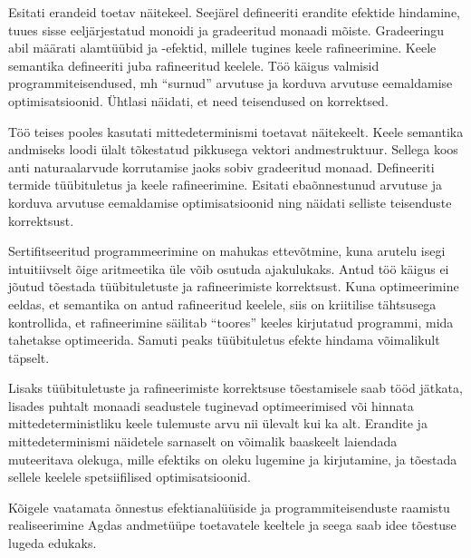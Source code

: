\documentclass[a4paper,12pt]{article}
\begin{document}
Esitati erandeid toetav näitekeel.
Seejärel defineeriti erandite efektide hindamine, tuues sisse eeljärjestatud monoidi ja gradeeritud monaadi mõiste.
Gradeeringu abil määrati alamtüübid ja -efektid, millele tugines keele rafineerimine.
Keele semantika defineeriti juba rafineeritud keelele.
Töö käigus valmisid programmiteisendused, mh ``surnud'' arvutuse ja korduva arvutuse eemaldamise optimisatsioonid.
Ühtlasi näidati, et need teisendused on korrektsed.

Töö teises pooles kasutati mittedeterminismi toetavat näitekeelt.
Keele semantika andmiseks loodi ülalt tõkestatud pikkusega vektori andmestruktuur.
Sellega koos anti naturaalarvude korrutamise jaoks sobiv gradeeritud monaad.
Defineeriti termide tüübituletus ja keele rafineerimine.
Esitati ebaõnnestunud arvutuse ja korduva arvutuse eemaldamise optimisatsioonid ning näidati selliste teisenduste korrektsust.

Sertifitseeritud programmeerimine on mahukas ettevõtmine, kuna arutelu isegi intuitiivselt õige aritmeetika üle võib osutuda ajakulukaks.
Antud töö käigus ei jõutud tõestada tüübituletuste ja rafineerimiste korrektsust.
Kuna optimeerimine eeldas, et semantika on antud rafineeritud keelele, siis on kriitilise tähtsusega kontrollida, et rafineerimine säilitab ``toores'' keeles kirjutatud programmi, mida tahetakse optimeerida.
Samuti peaks tüübituletus efekte hindama võimalikult täpselt.

Lisaks tüübituletuste ja rafineerimiste korrektsuse tõestamisele saab tööd jätkata, lisades puhtalt monaadi seadustele tuginevad optimeerimised või hinnata mittedeterministliku keele tulemuste arvu nii ülevalt kui ka alt.
Erandite ja mittedeterminismi näidetele sarnaselt on võimalik baaskeelt laiendada muteeritava olekuga, mille efektiks on oleku lugemine ja kirjutamine, ja tõestada sellele keelele spetsiifilised optimisatsioonid.


Kõigele vaatamata õnnestus efektianalüüside ja programmiteisenduste raamistu realiseerimine Agdas andmetüüpe toetavatele keeltele ja seega saab idee tõestuse lugeda edukaks.

\clearpage\vspace*{0pt}

\renewcommand{\baselinestretch}{1.15}
\small


\end{document}
